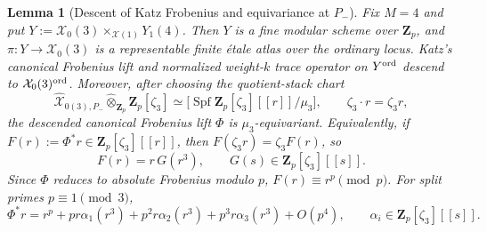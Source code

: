 \documentclass[11pt]{amsart}
\newtheorem{lemma}[theorem]{Lemma}
\theoremstyle{definition}
\theoremstyle{remark}
\newcommand{\Z}{\mathbf{Z}}
\begin{document}
\begin{lemma}[Descent of Katz Frobenius and equivariance at $P_-$]\label{lem:katz-trace-descent}\label{lem:canonical-frobenius-via-atlas}\label{prop:descent-to-X03}\label{prop:local-frobenius-normal-form}\label{prop:stack-local-form-P-minus}
Fix $M=4$ and put $Y:=\mathcal X_0(3)\times_{\mathcal X(1)}Y_1(4)$. Then $Y$ is a fine modular scheme over $\Z_p$, and $\pi:Y\to\mathcal X_0(3)$ is a representable finite étale atlas over the ordinary locus. Katz's canonical Frobenius lift and normalized weight-$k$ trace operator on $Y^{\rm ord}$ descend to $\mathcal X_0(3)^{\rm ord}$. Moreover, after choosing the quotient-stack chart
\[
\widehat{\mathcal X}_{0(3),P_-}\widehat\otimes_{\Z_p}\Z_p[\zeta_3]\simeq \bigl[\operatorname{Spf}\Z_p[\zeta_3][[r]]/\mu_3\bigr],\qquad \zeta_3\cdot r=\zeta_3 r,
\]
the descended canonical Frobenius lift $\Phi$ is $\mu_3$-equivariant. Equivalently, if $F(r):=\Phi^*r\in\Z_p[\zeta_3][[r]]$, then $F(\zeta_3 r)=\zeta_3 F(r)$, so
\[
F(r)=r\,G(r^3),\qquad G(s)\in\Z_p[\zeta_3][[s]].
\]
Since $\Phi$ reduces to absolute Frobenius modulo $p$, $F(r)\equiv r^p\pmod p$. For split primes $p\equiv 1\pmod 3$,
\begin{equation}\label{eq:Phi-local}
\Phi^*r=r^p+pr\alpha_1(r^3)+p^2r\alpha_2(r^3)+p^3r\alpha_3(r^3)+O(p^4),\qquad \alpha_i\in\Z_p[\zeta_3][[s]].
\end{equation}
\end{lemma}
\end{document}

